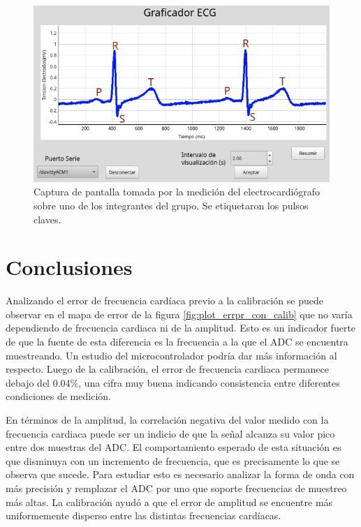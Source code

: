 \documentclass[conference]{IEEEtran}
\begin{document}
\begin{figure}[t]
    \centering
    \includegraphics[width=\linewidth]{figs/graficador_ecg_etiquetado.png}
    \caption{Captura de pantalla tomada por la medición del electrocardiógrafo sobre 
    uno de los integrantes del grupo. Se etiquetaron los pulsos claves.}
    \label{fig:ecg_real}

\end{figure}





\section{Conclusiones}

Analizando el error de frecuencia cardíaca previo a la calibración se puede observar
en el mapa de error de la figura \ref{fig:plot_errpr_con_calib} que no varía
dependiendo de frecuencia cardiaca ni de la amplitud.
Esto es un indicador fuerte de que la fuente de esta diferencia es la frecuencia a
la que el ADC se encuentra muestreando. Un estudio del microcontrolador
podría dar más información al respecto. Luego de la calibración, el error de
frecuencia cardiaca permanece debajo del 0.04\%, una cifra muy buena indicando
consistencia entre diferentes condiciones de medición.

En términos de la amplitud, la correlación negativa del valor medido con la
frecuencia cardiaca puede ser un indicio de que la señal alcanza su valor pico
entre dos muestras del ADC. El comportamiento esperado de esta situación es que
disminuya con un incremento de frecuencia, que es precisamente lo que se observa
que sucede.
Para estudiar esto es necesario analizar la forma de onda con más precisión y 
remplazar el ADC por uno que soporte frecuencias de muestreo más altas. La calibración
ayudó a que el error de amplitud se encuentre más uniformemente disperso entre
las distintas frecuencias cardíacas.
\end{document}
